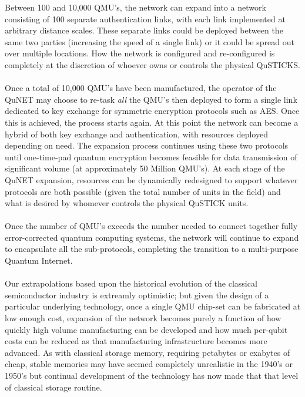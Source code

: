 \documentclass[aps,prl,twocolumn,10pt,nofootinbib]{revtex4}
\begin{document}
Between 100 and 10,000 QMU's, the network can expand into a network consisting of 100 separate authentication links, with each link implemented at arbitrary distance scales.  These separate links could be deployed between the same two parties (increasing the speed of a single link) or it could be spread out over multiple locations.  How the network is configured and re-configured is completely at the discretion of whoever owns or controls the physical QuSTICKS.  
\\
\\
Once a total of 10,000 QMU's have been manufactured, the operator of the QuNET may choose to re-task {\em all} the QMU's then deployed to form a single link dedicated to key exchange for symmetric encryption protocols such as AES.  Once this is achieved, the process starts again.  At this point the network can become a hybrid of both key exchange and authentication, with resources deployed depending on need.  The expansion process continues using these two protocols until one-time-pad quantum encryption becomes feasible for data transmission of significant volume (at approximately 50 Million QMU's).  At each stage of the QuNET expansion, resources can be dynamically redesigned to support whatever protocols are both possible (given the total number of units in the field) and what is desired by whomever controls the physical QuSTICK units.  
\\
\\
Once the number of QMU's exceeds the number needed to connect together fully error-corrected quantum computing systems, the network will continue to expand to encapsulate all the sub-protocols, completing the transition to a multi-purpose Quantum Internet.  
\\
\\
Our extrapolations based upon the historical evolution of the classical semiconductor industry is extreamly optimistic; but given the design of a particular underlying technology, once a single QMU chip-set can be fabricated at low enough cost, expansion of the network becomes purely a function of how quickly high volume manufacturing can be developed and how much per-qubit costs can be reduced as that manufacturing infrastructure becomes more advanced.  As with classical storage memory, requiring petabytes or exabytes of cheap, stable memories may have seemed completely unrealistic in the 1940's or 1950's but continual development of the technology has now made that that level of classical storage routine.
\end{document}
